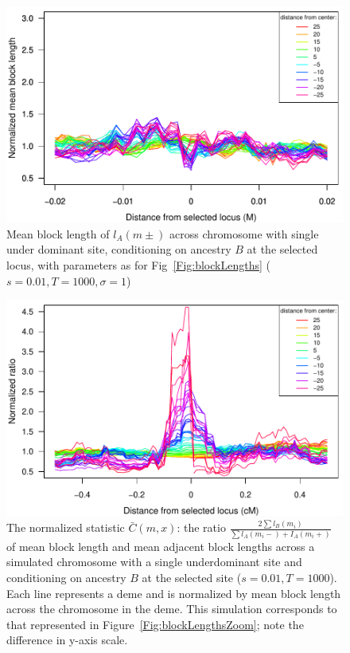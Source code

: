 \begin{figure}
\includegraphics{figs/adjacentBlocksAlongChromAncBConditioning.pdf}
\caption{Mean block length of $l_A(m\pm)$ across chromosome with single under dominant site, conditioning on ancestry $B$ at the selected locus, with parameters as for Fig~\ref{Fig:blockLengths} ($s=0.01, T=1000, \sigma=1$)}\label{Supp:adjacentBlocks}
\end{figure}


\begin{figure}
\includegraphics{figs/s0point01_ratioAdjacentBlocksAlongChromAncBConditioningHighRes.pdf}
    \caption{The normalized statistic $\bar C(m,x)$: the ratio $\frac{2\sum{l_B(m_i)}}{\sum{l_A(m_i-)+I_A(m_i+)}}$ of mean block length and mean adjacent block lengths across a simulated chromosome with a single underdominant site and conditioning on ancestry $B$ at the selected site ($s=0.01, T=1000$).  Each line represents a deme and is normalized by mean block length across the chromosome in the deme. This  simulation corresponds to that represented in Figure~\ref{Fig:blockLengthsZoom}; note the difference in y-axis scale.}\label{Supp:ratioBlockAdjacent}
\end{figure}


